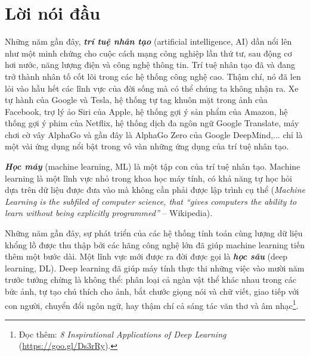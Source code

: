 
\setcounter{chapter}{-1}
\chapter{Lời nói đầu}
\label{cha:introduce}

Những năm gần đây, \textbf{\textit{trí tuệ nhân tạo}} ({artificial
intelligence, AI}) dần nổi lên như một minh chứng cho cuộc cách mạng công
nghiệp lần thứ tư, sau động cơ hơi nước, năng lượng điện và công nghệ thông
tin. Trí tuệ nhân tạo đã và đang trở thành nhân tố cốt lõi trong các hệ thống
công nghệ cao. Thậm chí, nó đã len lỏi vào hầu hết các lĩnh vực của đời sống mà
có thể chúng ta không nhận ra. Xe tự hành của Google và Tesla, hệ thống tự tag
khuôn mặt trong ảnh của Facebook, trợ lý ảo Siri của Apple, hệ thống gợi ý sản
phẩm của Amazon, hệ thống gợi ý phim của Netflix, hệ thống dịch đa ngôn ngữ
Google Translate, máy chơi cờ vây AlphaGo và gần đây là AlphaGo Zero của Google
DeepMind,... chỉ là một vài ứng dụng nổi bật trong vô vàn những ứng dụng của
trí tuệ nhân tạo.

\textbf{\textit{Học máy}} ({machine learning, ML}) là một tập con của
trí tuệ nhân tạo. Machine learning là một lĩnh vực nhỏ trong khoa học máy tính,
có khả năng tự học hỏi dựa trên dữ liệu được đưa vào mà không cần phải được lập
trình cụ thể (\textit{Machine Learning is the subfiled of computer science, that
``gives computers the ability to learn without being explicitly programmed''} --
Wikipedia).

Những năm gần đây, sự phát triển của các hệ thống tính toán cùng lượng dữ liệu
khổng lồ được thu thập bởi các hãng công nghệ lớn đã giúp machine learning tiến
thêm một bước dài. Một lĩnh vực mới được ra đời được gọi là \textbf{\textit{học
sâu}} ({deep learning, DL}). Deep learning đã giúp máy tính thực thi
những việc vào mười năm trước tưởng chừng là không thể: phân loại cả ngàn vật
thể khác nhau trong các bức ảnh, tự tạo chú thích cho ảnh, bắt chước giọng nói
và chữ viết, giao tiếp với con người, chuyển đổi ngôn ngữ, hay thậm chí cả sáng
tác văn thơ và âm nhạc\footnote{Đọc thêm: \textit{8 Inspirational Applications
of Deep Learning} (\url{https://goo.gl/Ds3rRy}).}.


